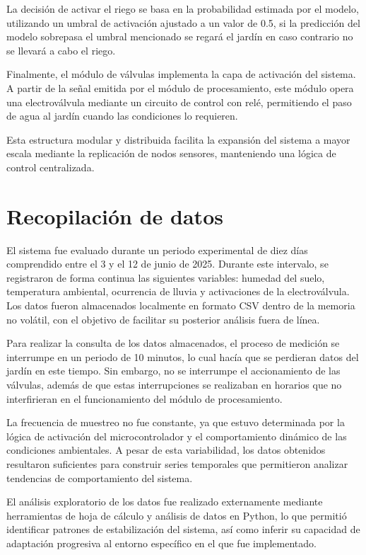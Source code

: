 \documentclass[pdflatex,sn-mathphys-num]{sn-jnl}%
\theoremstyle{thmstyleone}%
\theoremstyle{thmstyletwo}%
\theoremstyle{thmstylethree}%
\begin{document}
\begin{multicols}{2}
La decisión de activar el riego se basa en la probabilidad estimada por el modelo, utilizando un umbral de activación ajustado a un valor de 0.5, si la predicción del modelo sobrepasa el umbral mencionado se regará el jardín en caso contrario no se llevará a cabo el riego. 

Finalmente, el módulo de válvulas implementa la capa de activación del sistema. A partir de la señal emitida por el módulo de procesamiento, este módulo opera una electroválvula mediante un circuito de control con relé, permitiendo el paso de agua al jardín cuando las condiciones lo requieren. 

Esta estructura modular y distribuida facilita la expansión del sistema a mayor escala mediante la replicación de nodos sensores, manteniendo una lógica de control centralizada.

\section*{Recopilación de datos}

El sistema fue evaluado durante un periodo experimental de diez días comprendido entre el 3 y el 12 de junio de 2025. Durante este intervalo, se registraron de forma continua las siguientes variables: humedad del suelo, temperatura ambiental, ocurrencia de lluvia y activaciones de la electroválvula. Los datos fueron almacenados localmente en formato CSV dentro de la memoria no volátil, con el objetivo de facilitar su posterior análisis fuera de línea.

Para realizar la consulta de los datos almacenados, el proceso de medición se interrumpe en un periodo de 10 minutos, lo cual hacía que se perdieran datos del jardín en este tiempo. Sin embargo, no se interrumpe el accionamiento de las válvulas, además de que estas interrupciones se realizaban en horarios que no interfirieran en el funcionamiento del módulo de procesamiento.

La frecuencia de muestreo no fue constante, ya que estuvo determinada por la lógica de activación del microcontrolador y el comportamiento dinámico de las condiciones ambientales. A pesar de esta variabilidad, los datos obtenidos resultaron suficientes para construir series temporales que permitieron analizar tendencias de comportamiento del sistema. 

El análisis exploratorio de los datos fue realizado externamente mediante herramientas de hoja de cálculo y análisis de datos en Python, lo que permitió identificar patrones de estabilización del sistema, así como inferir su capacidad de adaptación progresiva al entorno específico en el que fue implementado.


\end{multicols}
\end{document}

